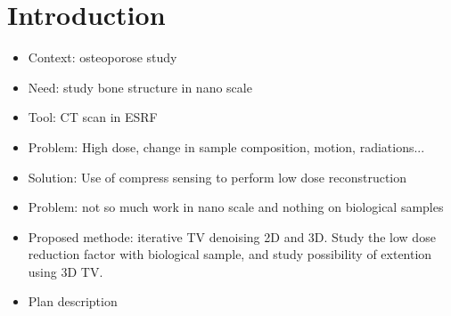 \chapter{Introduction}
\begin{itemize}
	\item Context: osteoporose study
	\item Need: study bone structure in nano scale
	\item Tool: CT scan in ESRF
	\item Problem: High dose, change in sample composition, motion, radiations...
	\item Solution: Use of compress sensing to perform low dose reconstruction
	\item Problem: not so much work in nano scale and nothing on biological samples
	\item Proposed methode: iterative TV denoising 2D and 3D. Study the low dose reduction factor with biological sample, and study possibility of extention using 3D TV.
	\item Plan description
\end{itemize}